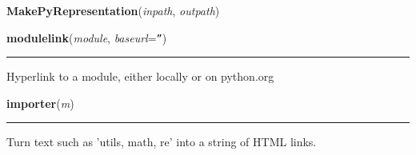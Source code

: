 \hspace{.8\funcindent}\begin{boxedminipage}{\funcwidth}

    \raggedright \textbf{MakePyRepresentation}(\textit{inpath}, \textit{outpath})

\setlength{\parskip}{2ex}
\setlength{\parskip}{1ex}
    \end{boxedminipage}

    \label{System:Web:py2html:modulelink}

    \vspace{0.5ex}

\hspace{.8\funcindent}\begin{boxedminipage}{\funcwidth}

    \raggedright \textbf{modulelink}(\textit{module}, \textit{baseurl}={\tt ''})

    \vspace{-1.5ex}

    \rule{\textwidth}{0.5\fboxrule}
\setlength{\parskip}{2ex}
    Hyperlink to a module, either locally or on python.org

\setlength{\parskip}{1ex}
    \end{boxedminipage}

    \label{System:Web:py2html:importer}

    \vspace{0.5ex}

\hspace{.8\funcindent}\begin{boxedminipage}{\funcwidth}

    \raggedright \textbf{importer}(\textit{m})

    \vspace{-1.5ex}

    \rule{\textwidth}{0.5\fboxrule}
\setlength{\parskip}{2ex}
    Turn text such as 'utils, math, re' into a string of HTML links.

\setlength{\parskip}{1ex}
    \end{boxedminipage}

    \label{System:Web:py2html:find1}

